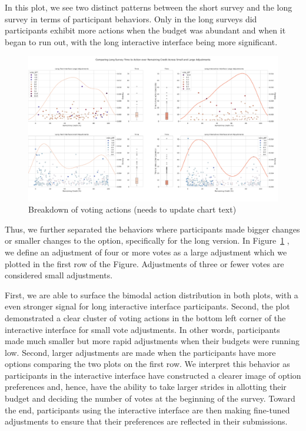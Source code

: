 In this plot, we see two distinct patterns between the short survey and the long survey in terms of participant behaviors. Only in the long surveys did participants exhibit more actions when the budget was abundant and when it began to run out, with the long interactive interface being more significant.

\begin{figure}[ht]
    \centering
    \includegraphics[width=\textwidth]{content/image/results/combined_density_plots.pdf}
    \caption{Breakdown of voting actions (needs to update chart text)}
    \label{fig:voting_v3_v4}
\end{figure}

Thus, we further separated the behaviors where participants made bigger changes or smaller changes to the option, specifically for the long version. In Figure~\ref{fig:voting_v3_v4} , we define an adjustment of four or more votes as a large adjustment which we plotted in the first row of the Figure. Adjustments of three or fewer votes are considered small adjustments.

First, we are able to surface the bimodal action distribution in both plots, with a even stronger signal for long interactive interface participants. Second, the plot demonstrated a clear cluster of voting actions in the bottom left corner of the interactive interface for small vote adjustments. In other words, participants made much smaller but more rapid adjustments when their budgets were running low. Second, larger adjustments are made when the participants have more options comparing the two plots on the first row. We interpret this behavior as participants in the interactive interface have constructed a clearer image of option preferences and, hence, have the ability to take larger strides in allotting their budget and deciding the number of votes at the beginning of the survey. Toward the end, participants using the interactive interface are then making fine-tuned adjustments to ensure that their preferences are reflected in their submissions.

